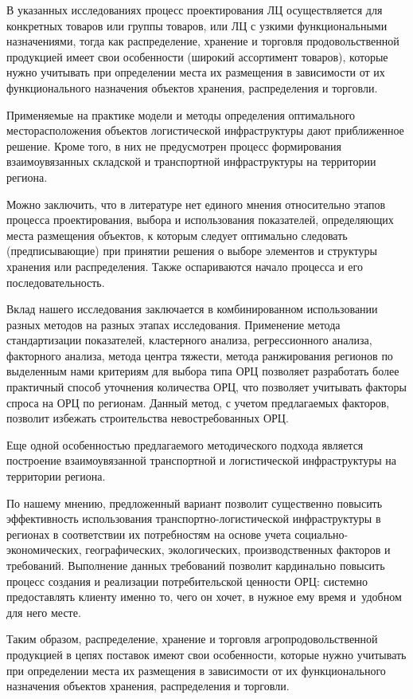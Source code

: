 В указанных исследованиях процесс проектирования ЛЦ осуществляется для
конкретных товаров или группы товаров, или ЛЦ с узкими функциональными
назначениями, тогда как распределение, хранение и торговля
продовольственной продукцией имеет свои особенности (широкий ассортимент
товаров), которые нужно учитывать при определении места их размещения в
зависимости от их функционального назначения объектов хранения,
распределения и торговли.

Применяемые на практике модели и методы определения оптимального
месторасположения объектов логистической инфраструктуры дают
приближенное решение. Кроме того, в них не предусмотрен процесс
формирования взаимоувязанных складской и транспортной инфраструктуры на
территории региона.

Можно заключить, что в литературе нет единого мнения относительно этапов
процесса проектирования, выбора и использования показателей,
определяющих места размещения объектов, к которым следует оптимально
следовать (предписывающие) при принятии решения о выборе элементов и
структуры хранения или распределения. Также оспариваются начало процесса
и его последовательность.

Вклад нашего исследования заключается в комбинированном использовании
разных методов на разных этапах исследования. Применение метода
стандартизации показателей, кластерного анализа, регрессионного анализа,
факторного анализа, метода центра тяжести, метода ранжирования регионов
по выделенным нами критериям для выбора типа ОРЦ позволяет разработать
более практичный способ уточнения количества ОРЦ, что позволяет
учитывать факторы спроса на ОРЦ по регионам. Данный метод, с учетом
предлагаемых факторов, позволит избежать строительства невостребованных
ОРЦ.

Еще одной особенностью предлагаемого методического подхода является
построение взаимоувязанной транспортной и логистической инфраструктуры
на территории региона.

По нашему мнению, предложенный вариант позволит существенно повысить
эффективность использования транспортно-логистической инфраструктуры в
регионах в соответствии их потребностям на основе учета
социально-экономических, географических, экологических, производственных
факторов и требований. Выполнение данных требований позволит кардинально
повысить процесс создания и реализации потребительской ценности ОРЦ:
системно предоставлять клиенту именно то, чего он хочет, в нужное ему
время и~удобном для него месте.

Таким образом, распределение, хранение и торговля агропродовольственной
продукцией в цепях поставок имеют свои особенности, которые нужно
учитывать при определении места их размещения в зависимости от их
функционального назначения объектов хранения, распределения и торговли.


